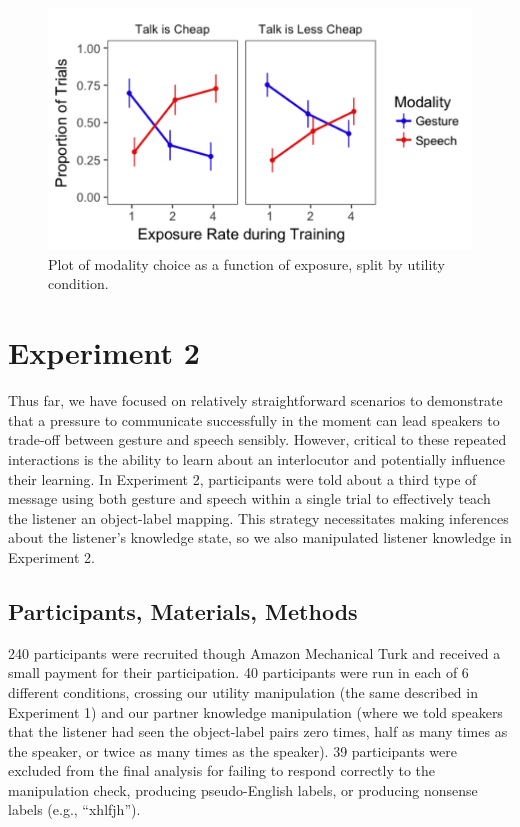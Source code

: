 \documentclass[10pt, letterpaper]{article}
\newenvironment{CodeChunk}{}{}
\begin{document}
\begin{CodeChunk}
\begin{figure}[H]

{\centering \includegraphics{figs/image1-1} 

}

\caption[Plot of modality choice as a function of exposure, split by utility condition]{Plot of modality choice as a function of exposure, split by utility condition.}\label{fig:image1}
\end{figure}
\end{CodeChunk}

\section{Experiment 2}\label{experiment-2}

Thus far, we have focused on relatively straightforward scenarios to
demonstrate that a pressure to communicate successfully in the moment
can lead speakers to trade-off between gesture and speech sensibly.
However, critical to these repeated interactions is the ability to learn
about an interlocutor and potentially influence their learning. In
Experiment 2, participants were told about a third type of message using
both gesture and speech within a single trial to effectively teach the
listener an object-label mapping. This strategy necessitates making
inferences about the listener's knowledge state, so we also manipulated
listener knowledge in Experiment 2.

\subsection{Participants, Materials,
Methods}\label{participants-materials-methods-1}

240 participants were recruited though Amazon Mechanical Turk and
received a small payment for their participation. 40 participants were
run in each of 6 different conditions, crossing our utility manipulation
(the same described in Experiment 1) and our partner knowledge
manipulation (where we told speakers that the listener had seen the
object-label pairs zero times, half as many times as the speaker, or
twice as many times as the speaker). 39 participants were excluded from
the final analysis for failing to respond correctly to the manipulation
check, producing pseudo-English labels, or producing nonsense labels
(e.g., ``xhlfjh'').
\end{document}

